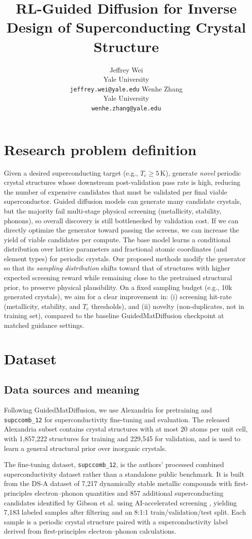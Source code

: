 \documentclass{article}
\title{RL-Guided Diffusion for Inverse Design of Superconducting Crystal Structure}
\author{
  Jeffrey Wei \\
  Yale University \\
  \texttt{jeffrey.wei@yale.edu}
  \And
  Wenhe Zhang \\
  Yale University \\
  \texttt{wenhe.zhang@yale.edu}
}
\newcommand{\Tc}{T_{\mathrm{c}}}
\begin{document}
\maketitle

\section{Research problem definition}
Given a desired superconducting target (e.g., $\Tc \ge 5\,$K), generate \emph{novel} periodic crystal structures whose downstream post-validation pass rate is high, reducing the number of expensive candidates that must be validated per final viable superconductor. Guided diffusion models can generate many candidate crystals, but the majority fail multi-stage physical screening (metallicity, stability, phonons), so overall discovery is still bottlenecked by validation cost.
If we can directly optimize the generator toward passing the screens, we can increase the yield of viable candidates per compute. The base model learns a conditional distribution over lattice parameters and fractional atomic coordinates (and element types) for periodic crystals.
Our proposed methods modify the generator so that its \emph{sampling distribution} shifts toward that of structures with higher expected screening reward while remaining close to the pretrained structural prior, to preserve physical plausibility. On a fixed sampling budget (e.g., 10k generated crystals), we aim for a clear improvement in:
(i) screening hit-rate (metallicity, stability, and $\Tc$ thresholds), and 
(ii) novelty (non-duplicates, not in training set),
compared to the baseline GuidedMatDiffusion checkpoint at matched guidance settings.

\section{Dataset}
\subsection{Data sources and meaning}
Following GuidedMatDiffusion, we use Alexandria for pretraining and \texttt{supccomb\_12} for superconductivity fine-tuning and evaluation. The released Alexandria subset contains crystal structures with at most 20 atoms per unit cell, with 1,857,222 structures for training and 229,545 for validation, and is used to learn a general structural prior over inorganic crystals.

The fine-tuning dataset, \texttt{supccomb\_12}, is the authors' processed combined superconductivity dataset rather than a standalone public benchmark. It is built from the DS-A dataset of 7,217 dynamically stable metallic compounds with first-principles electron--phonon quantities \cite{cerqueira2023sampling} and 857 additional superconducting candidates identified by Gibson et al. using AI-accelerated screening \cite{gibson2025workflow}, yielding 7,183 labeled samples after filtering and an 8:1:1 train/validation/test split. Each sample is a periodic crystal structure paired with a superconductivity label derived from first-principles electron--phonon calculations.
\end{document}
